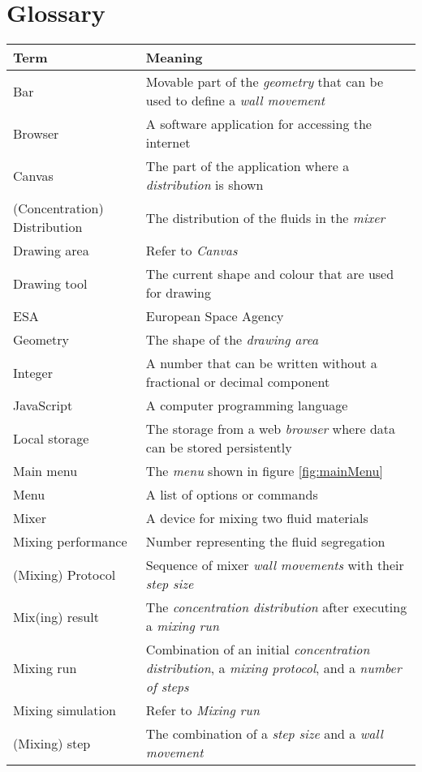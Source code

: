 \chapter{Glossary}
\begin{tabularx}{\textwidth}{lX}
    \toprule
    \textbf{Term} & \textbf{Meaning} \\
    \midrule
    Bar & Movable part of the \emph{geometry} that can be used to define a \emph{wall movement} \\
    Browser & A software application for accessing the internet \\
    Canvas & The part of the application where a \emph{distribution} is shown \\
    (Concentration) Distribution & The distribution of the fluids in the \emph{mixer} \\
    Drawing area & Refer to \emph{Canvas}\\
    Drawing tool & The current shape and colour that are used for drawing\\
    ESA & European Space Agency \\
    Geometry & The shape of the \emph{drawing area} \\
    Integer & A number that can be written without a fractional or decimal component \\
    JavaScript & A computer programming language \\
    Local storage & The storage from a web \emph{browser} where data can be stored persistently\\
    Main menu & The \emph{menu} shown in figure \ref{fig:mainMenu}\\
    Menu & A list of options or commands \\
    Mixer & A device for mixing two fluid materials \\ 
    Mixing performance & Number representing the fluid segregation \\
    (Mixing) Protocol & Sequence of mixer \emph{wall movements} with their \emph{step size} \\
    Mix(ing) result & The \emph{concentration distribution} after executing a \emph{mixing run} \\
    Mixing run & Combination of an initial \emph{concentration distribution}, a \emph{mixing protocol}, and a \emph{number of steps} \\
    Mixing simulation & Refer to \emph{Mixing run}\\
    (Mixing) step & The combination of a \emph{step size} and a \emph{wall movement} \\

\end{tabularx}
